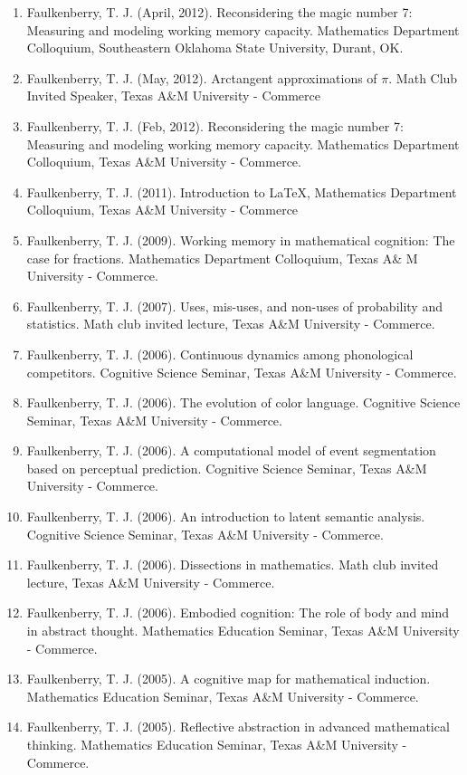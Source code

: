 \documentclass[article,10pt]{article}
\begin{document}
\begin{enumerate}
\item Faulkenberry, T. J. (April, 2012). Reconsidering the magic number 7: Measuring and modeling working memory capacity. Mathematics Department Colloquium, Southeastern Oklahoma State University, Durant, OK.
\item Faulkenberry, T. J. (May, 2012). Arctangent approximations of \(\pi\). Math Club Invited Speaker, Texas A\&M University - Commerce
\item Faulkenberry, T. J. (Feb, 2012). Reconsidering the magic number 7: Measuring and modeling working memory capacity. Mathematics Department Colloquium, Texas A\&M University - Commerce.
\item Faulkenberry, T. J. (2011). Introduction to \LaTeX{}, Mathematics Department Colloquium, Texas A\&M University - Commerce
\item Faulkenberry, T. J. (2009). Working memory in mathematical cognition: The case for fractions. Mathematics Department Colloquium, Texas A\& M University - Commerce.
\item Faulkenberry, T. J. (2007). Uses, mis-uses, and non-uses of probability and statistics. Math club invited lecture, Texas A\&M University - Commerce.
\item Faulkenberry, T. J. (2006). Continuous dynamics among phonological competitors. Cognitive Science Seminar, Texas A\&M University - Commerce.
\item Faulkenberry, T. J. (2006). The evolution of color language. Cognitive Science Seminar, Texas A\&M University - Commerce.
\item Faulkenberry, T. J. (2006). A computational model of event segmentation based on perceptual prediction. Cognitive Science Seminar, Texas A\&M University - Commerce.
\item Faulkenberry, T. J. (2006). An introduction to latent semantic analysis. Cognitive Science Seminar, Texas A\&M University - Commerce.
\item Faulkenberry, T. J. (2006). Dissections in mathematics. Math club invited lecture, Texas A\&M University - Commerce.
\item Faulkenberry, T. J. (2006). Embodied cognition: The role of body and mind in abstract thought. Mathematics Education Seminar, Texas A\&M University - Commerce.
\item Faulkenberry, T. J. (2005). A cognitive map for mathematical induction. Mathematics Education Seminar, Texas A\&M University - Commerce.
\item Faulkenberry, T. J. (2005). Reflective abstraction in advanced mathematical thinking. Mathematics Education Seminar, Texas A\&M University - Commerce.

\end{enumerate}
\end{document}
